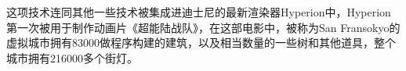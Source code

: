 这项技术连同其他一些技术被集成进迪士尼的最新渲染器Hyperion中，Hyperion第一次被用于制作动画片《超能陆战队》，在这部电影中，被称为San Fransokyo的虚拟城市拥有83000做程序构建的建筑，以及相当数量的一些树和其他道具，整个城市拥有216000多个街灯。


